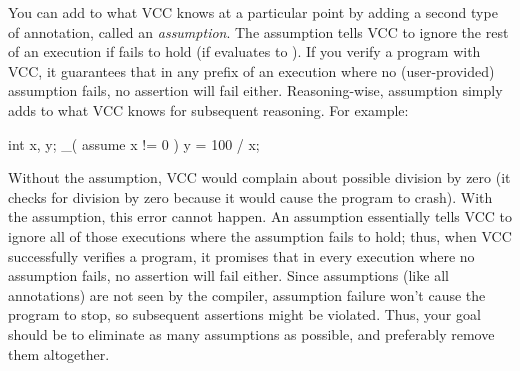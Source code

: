 You can add to what VCC knows at a particular point by adding a second
type of annotation, called an \emph{assumption}.
The assumption  tells VCC to ignore
the rest of an execution if  fails to hold (\ie if
 evaluates to ). If you verify a
program with VCC, it guarantees that in any prefix of an execution
where no (user-provided) assumption fails, no assertion will fail either.
Reasoning-wise, assumption simply adds  to what VCC
knows for subsequent reasoning. For example:
\begin{VCC}
int x, y;
_( assume x != 0 )
y = 100 / x;
\end{VCC}
Without the assumption, VCC would complain about possible division by
zero (it checks for division by zero because it would cause the
program to crash).  With the assumption, this error cannot happen.  An
assumption essentially tells VCC to ignore all of those executions
where the assumption fails to hold; thus, when VCC successfully
verifies a program, it promises that in every execution where no
assumption fails, no assertion will fail either.  Since
assumptions (like all annotations) are not seen by the compiler,
assumption failure won't cause the program to stop, so subsequent
assertions might be violated.  Thus, your goal should be to eliminate
as many assumptions as possible, and preferably remove them altogether.

